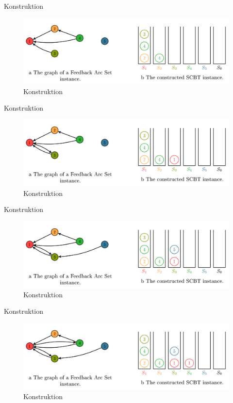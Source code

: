 \documentclass{beamer}
\begin{document}
\begin{frame}{Konstruktion}
\begin{figure}[ht]
		\includegraphics[width=\textwidth]{construct06}
		\caption{Konstruktion}
    \end{figure}
\end{frame}

\begin{frame}{Konstruktion}
\begin{figure}[ht]
		\includegraphics[width=\textwidth]{construct05}
		\caption{Konstruktion}
    \end{figure}
\end{frame}

\begin{frame}{Konstruktion}
\begin{figure}[ht]
		\includegraphics[width=\textwidth]{construct04}
		\caption{Konstruktion}
    \end{figure}
\end{frame}

\begin{frame}{Konstruktion}
\begin{figure}[ht]
		\includegraphics[width=\textwidth]{construct03}
		\caption{Konstruktion}
    \end{figure}
\end{frame}
\end{document}
